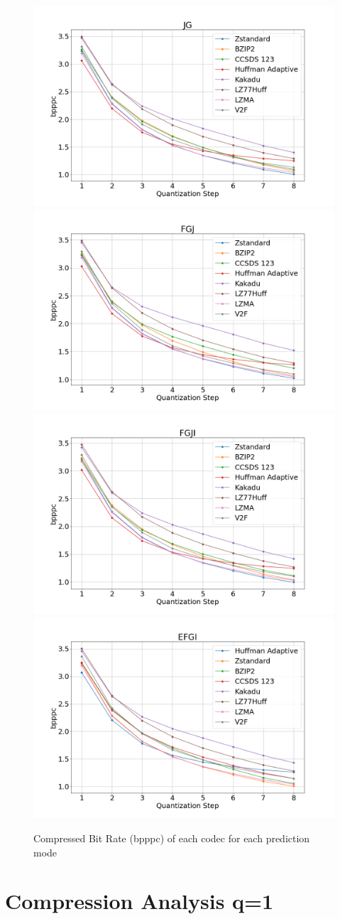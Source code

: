\documentclass{article}
\begin{document}
\begin{figure}
    \includegraphics[width=0.4\linewidth]{figures/JG_bpppc_q.png}
    \includegraphics[width=0.4\linewidth]{figures/FGJ_bpppc_q.png}
    \includegraphics[width=0.4\linewidth]{figures/FGJI_bpppc_q.png}
    \includegraphics[width=0.4\linewidth]{figures/EFGI_bpppc_q.png}
    \caption{Compressed Bit Rate (bpppc) of each codec for each prediction mode}
    \label{fig:bpppc}
\end{figure}

\newpage

\section{Compression Analysis q=1}
\end{document}
